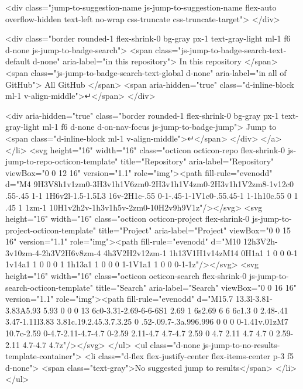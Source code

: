                     <div class="jump-to-suggestion-name js-jump-to-suggestion-name flex-auto overflow-hidden text-left no-wrap css-truncate css-truncate-target">
                    </div>

                    <div class="border rounded-1 flex-shrink-0 bg-gray px-1 text-gray-light ml-1 f6 d-none js-jump-to-badge-search">
                      <span class="js-jump-to-badge-search-text-default d-none" aria-label="in this repository">
                        In this repository
                      </span>
                      <span class="js-jump-to-badge-search-text-global d-none" aria-label="in all of GitHub">
                        All GitHub
                      </span>
                      <span aria-hidden="true" class="d-inline-block ml-1 v-align-middle">↵</span>
                    </div>

                    <div aria-hidden="true" class="border rounded-1 flex-shrink-0 bg-gray px-1 text-gray-light ml-1 f6 d-none d-on-nav-focus js-jump-to-badge-jump">
                      Jump to
                      <span class="d-inline-block ml-1 v-align-middle">↵</span>
                    </div>
                  </a>
                </li>
                <svg height="16" width="16" class="octicon octicon-repo flex-shrink-0 js-jump-to-repo-octicon-template" title="Repository" aria-label="Repository" viewBox="0 0 12 16" version="1.1" role="img"><path fill-rule="evenodd" d="M4 9H3V8h1v1zm0-3H3v1h1V6zm0-2H3v1h1V4zm0-2H3v1h1V2zm8-1v12c0 .55-.45 1-1 1H6v2l-1.5-1.5L3 16v-2H1c-.55 0-1-.45-1-1V1c0-.55.45-1 1-1h10c.55 0 1 .45 1 1zm-1 10H1v2h2v-1h3v1h5v-2zm0-10H2v9h9V1z"/></svg>
                <svg height="16" width="16" class="octicon octicon-project flex-shrink-0 js-jump-to-project-octicon-template" title="Project" aria-label="Project" viewBox="0 0 15 16" version="1.1" role="img"><path fill-rule="evenodd" d="M10 12h3V2h-3v10zm-4-2h3V2H6v8zm-4 4h3V2H2v12zm-1 1h13V1H1v14zM14 0H1a1 1 0 0 0-1 1v14a1 1 0 0 0 1 1h13a1 1 0 0 0 1-1V1a1 1 0 0 0-1-1z"/></svg>
                <svg height="16" width="16" class="octicon octicon-search flex-shrink-0 js-jump-to-search-octicon-template" title="Search" aria-label="Search" viewBox="0 0 16 16" version="1.1" role="img"><path fill-rule="evenodd" d="M15.7 13.3l-3.81-3.83A5.93 5.93 0 0 0 13 6c0-3.31-2.69-6-6-6S1 2.69 1 6s2.69 6 6 6c1.3 0 2.48-.41 3.47-1.11l3.83 3.81c.19.2.45.3.7.3.25 0 .52-.09.7-.3a.996.996 0 0 0 0-1.41v.01zM7 10.7c-2.59 0-4.7-2.11-4.7-4.7 0-2.59 2.11-4.7 4.7-4.7 2.59 0 4.7 2.11 4.7 4.7 0 2.59-2.11 4.7-4.7 4.7z"/></svg>
              </ul>
              <ul class="d-none js-jump-to-no-results-template-container">
                <li class="d-flex flex-justify-center flex-items-center p-3 f5 d-none">
                  <span class="text-gray">No suggested jump to results</span>
                </li>
              </ul>

